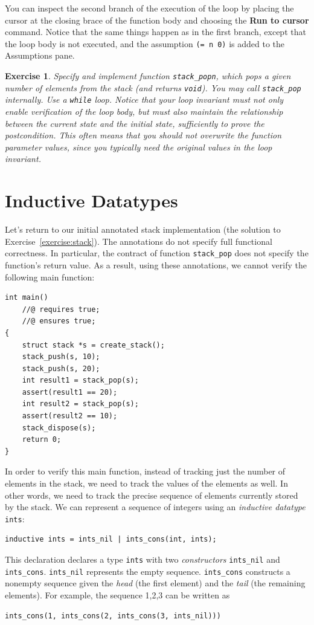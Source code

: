 \documentclass{article}
\newtheorem{exercise}{Exercise}
\begin{document}
You can inspect the second branch of the execution of the loop
by placing the cursor at the closing brace of the function body
and choosing the \textbf{Run to cursor} command. Notice that
the same things happen as in the first branch, except that the
loop body is not executed, and the assumption %
\lstinline!(= n 0)! is added to the Assumptions pane.

\begin{exercise}\label{exercise:popn}
Specify and implement function \lstinline!stack_popn!, which
pops a given number of elements from the stack (and returns
\lstinline!void!). You may call \lstinline!stack_pop!
internally. Use a \lstinline!while! loop. Notice that your loop
invariant must not only enable verification of the loop body,
but must also maintain the relationship between the current
state and the initial state, sufficiently to prove the
postcondition. This often means that you should not overwrite
the function parameter values, since you typically need the
original values in the loop invariant.
\end{exercise}

\section{Inductive Datatypes}\label{section:datatypes}

Let's return to our initial annotated stack implementation (the
solution to Exercise~\ref{exercise:stack}). The annotations do
not specify full functional correctness. In particular, the
contract of function \lstinline!stack_pop! does not specify the
function's return value. As a result, using these annotations,
we cannot verify the following main function:
\begin{lstlisting}
int main()
    //@ requires true;
    //@ ensures true;
{
    struct stack *s = create_stack();
    stack_push(s, 10);
    stack_push(s, 20);
    int result1 = stack_pop(s);
    assert(result1 == 20);
    int result2 = stack_pop(s);
    assert(result2 == 10);
    stack_dispose(s);
    return 0;
}
\end{lstlisting}

In order to verify this main function, instead of tracking just
the number of elements in the stack, we need to track the
values of the elements as well. In other words, we need to
track the precise sequence of elements currently stored by the
stack. We can represent a sequence of integers using an
\emph{inductive datatype} \lstinline!ints!:
\begin{lstlisting}
inductive ints = ints_nil | ints_cons(int, ints);
\end{lstlisting}
This declaration declares a type \lstinline!ints! with two
\emph{constructors} \lstinline!ints_nil! and
\lstinline!ints_cons!. \lstinline!ints_nil! represents the
empty sequence. \lstinline!ints_cons! constructs a nonempty
sequence given the \emph{head} (the first element) and the
\emph{tail} (the remaining elements). For example, the sequence
1,2,3 can be written as
\begin{lstlisting}
ints_cons(1, ints_cons(2, ints_cons(3, ints_nil)))
\end{lstlisting}
\end{document}
